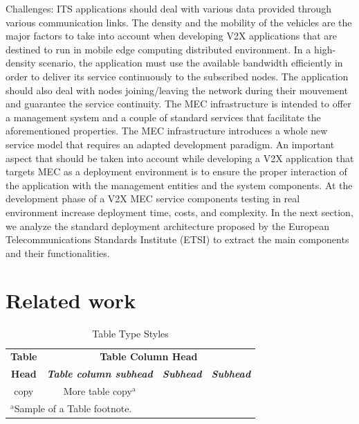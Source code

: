 \documentclass[conference]{IEEEtran}
\begin{document}
Challenges: 
ITS applications should deal with various data provided
through various communication links. The density and the
mobility of the vehicles are the major factors to take into account
when developing V2X applications that are destined to run in
mobile edge computing distributed environment. In a high-density
scenario, the application must use the available bandwidth
efficiently in order to deliver its service continuously to the
subscribed nodes. The application should also deal with nodes
joining/leaving the network during their mouvement and
guarantee the service continuity. The MEC infrastructure is
intended to offer a management system and a couple of standard
services that facilitate the aforementioned properties. The MEC
infrastructure introduces a whole new service model that requires
an adapted development paradigm.
An important aspect that should be taken into account while
developing a V2X application that targets MEC as a deployment
environment is to ensure the proper interaction of the application
with the management entities and the system components. At the
development phase of a V2X MEC service components testing in
real environment increase deployment time, costs, and
complexity. In the next section, we analyze the standard
deployment architecture proposed by the European
Telecommunications Standards Institute (ETSI) to extract the
main components and their functionalities.

\section{Related work}
\begin{table}[htbp]
\caption{Table Type Styles}
\begin{center}
\begin{tabular}{|c|c|c|c|}
\hline
\textbf{Table}&\multicolumn{3}{|c|}{\textbf{Table Column Head}} \\
\cline{2-4} 
\textbf{Head} & \textbf{\textit{Table column subhead}}& \textbf{\textit{Subhead}}& \textbf{\textit{Subhead}} \\
\hline
copy& More table copy$^{\mathrm{a}}$& &  \\
\hline
\multicolumn{4}{l}{$^{\mathrm{a}}$Sample of a Table footnote.}
\end{tabular}
\label{tab1}
\end{center}
\end{table}
\end{document}
